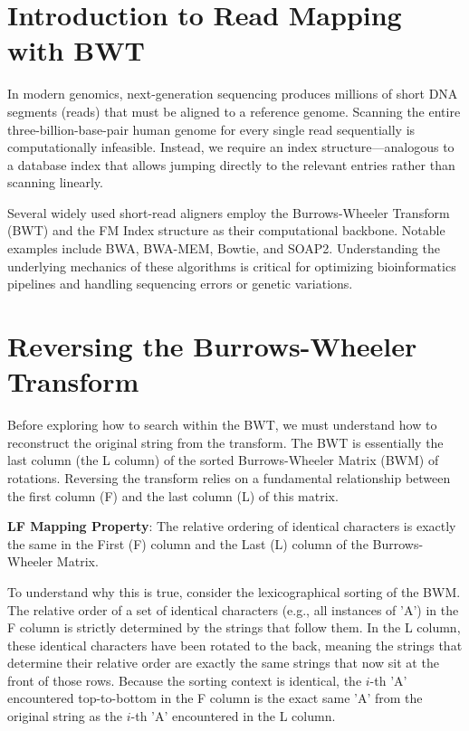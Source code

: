 


\section{Introduction to Read Mapping with BWT}

In modern genomics, next-generation sequencing produces millions of short DNA segments (reads) that must be aligned to a reference genome. Scanning the entire three-billion-base-pair human genome for every single read sequentially is computationally infeasible. Instead, we require an index structure—analogous to a database index that allows jumping directly to the relevant entries rather than scanning linearly. 

Several widely used short-read aligners employ the Burrows-Wheeler Transform (BWT) and the FM Index structure as their computational backbone. Notable examples include BWA, BWA-MEM, Bowtie, and SOAP2. \sta Understanding the underlying mechanics of these algorithms is critical for optimizing bioinformatics pipelines and handling sequencing errors or genetic variations.

\section{Reversing the Burrows-Wheeler Transform}

Before exploring how to search within the BWT, we must understand how to reconstruct the original string from the transform. The BWT is essentially the last column (the L column) of the sorted Burrows-Wheeler Matrix (BWM) of rotations. Reversing the transform relies on a fundamental relationship between the first column (F) and the last column (L) of this matrix.

\begin{important}
    \textbf{LF Mapping Property}: The relative ordering of identical characters is exactly the same in the First (F) column and the Last (L) column of the Burrows-Wheeler Matrix. 
\end{important}

To understand why this is true, consider the lexicographical sorting of the BWM. The relative order of a set of identical characters (e.g., all instances of 'A') in the F column is strictly determined by the strings that follow them. In the L column, these identical characters have been rotated to the back, meaning the strings that determine their relative order are exactly the same strings that now sit at the front of those rows. Because the sorting context is identical, the $i$-th 'A' encountered top-to-bottom in the F column is the exact same 'A' from the original string as the $i$-th 'A' encountered in the L column.

